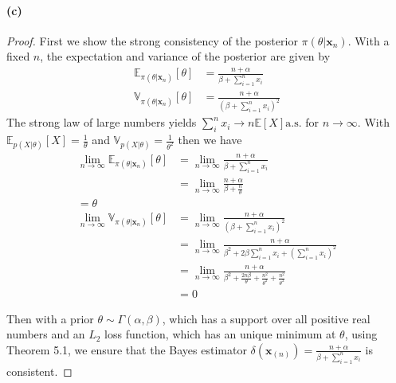\paragraph{(c)}
\begin{proof}
First we show the strong consistency of the posterior $\pi(\theta \vert \bm{x}_n)$. With a fixed $n$, the expectation and variance of the posterior are given by
\begin{align*}
    \mathbb{E}_{\pi(\theta \vert \bm{x}_n)} [\theta]
    &= \frac{n+\alpha}{\beta + \sum_{i=1}^n x_i} \\
    \mathbb{V}_{\pi(\theta \vert \bm{x}_n)} [\theta]
    &= \frac{n+\alpha}{(\beta + \sum_{i=1}^n x_i)^2}
\end{align*}
The strong law of large numbers yields $\sum_{i}^{n}x_i \rightarrow n\mathbb{E} [X] \mathrm{a.s.}$ for $n\rightarrow \infty$. With $\mathbb{E}_{p(X \vert \theta)}[X] =\frac{1}{\theta} $ and $\mathbb{V}_{p(X \vert \theta)} = \frac{1}{\theta^2}$ then we have
\begin{align*}
    \lim_{n\rightarrow\infty} \mathbb{E}_{\pi(\theta \vert \bm{x}_n)} [\theta]
    &= \lim_{n\rightarrow\infty}  \frac{n+\alpha}{\beta + \sum_{i=1}^n x_i} \\
    &= \lim_{n\rightarrow\infty} \frac{n+\alpha}{\beta + \frac{n}{\theta}} \\
    = \theta\\
    \lim_{n\rightarrow\infty} \mathbb{V}_{\pi(\theta \vert \bm{x}_n)} [\theta]
    &= \lim_{n\rightarrow\infty} \frac{n+\alpha}{(\beta + \sum_{i=1}^n x_i)^2}\\
    &= \lim_{n\rightarrow\infty} \frac{n+\alpha}{\beta^2 + 2\beta \sum_{i=1}^n x_i + (\sum_{i=1}^n x_i)^2}\\
    &= \lim_{n\rightarrow\infty} \frac{n+\alpha}{\beta^2 + \frac{2n\beta}{\theta} + \frac{n^2}{\theta^2} + \frac{n^2}{\theta^2}}\\
    &= 0
\end{align*}

Then with a prior $\theta \sim \Gamma(\alpha, \beta)$, which has a support over all positive real numbers and an $L_2$ loss function, which has an unique minimum at $\theta$, using Theorem 5.1, we ensure that the Bayes estimator $\delta(\bm{x}_{(n)}) = \frac{n+\alpha}{\beta + \sum_{i=1}^n x_i}$ is consistent.

\end{proof}